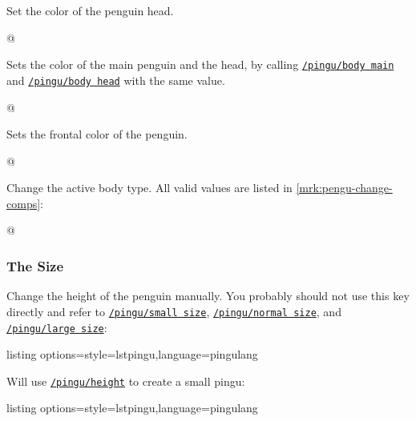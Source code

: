 \documentclass[parskip=half,english,numbers=noenddot,footnotes=nomultiple,oneside,fontsize=10pt,DIV=15,headinclude]{scrartcl}
\makeatletter
\def\pingu@listing@text{}
\def\lpingu#1{\begingroup\def\pingu@listing@text{#1}\lstinline[style=lstpingu,breakatwhitespace]'#1'\endgroup}
\newcommand*\keyref[2][/pingu/]{\hyperref[pk:#1#2]{\lpingu{#1#2}}}
\makeatother
\begin{document}
	Set the color of the penguin head.%
\begin{tcblisting}{@}
\begin{tikzpicture}
	\pingu[body head=green]
\end{tikzpicture}
\end{tcblisting}
\endkeyexplain


	Sets the color of the main penguin and the head, by calling \keyref{body main} and \keyref{body head} with the same value.
\begin{tcblisting}{@}
\begin{tikzpicture}
	\pingu[body=green]
\end{tikzpicture}
\end{tcblisting}
\endkeyexplain


	Sets the frontal color of the penguin.
\begin{tcblisting}{@}
\begin{tikzpicture}
	\pingu[body front=green]
\end{tikzpicture}
\end{tcblisting}
\endkeyexplain


	Change the active body type. All valid values are listed in \autoref{mrk:pengu-change-comps}:
\begin{tcblisting}{@}
\begin{tikzpicture}
	\pingu[body type=legacy]
\end{tikzpicture}
\end{tcblisting}
\endkeyexplain

\subsubsection{The Size}


	Change the height of the penguin manually. You probably should not use this key directly and refer to \keyref{small size}, \keyref{normal size}, and \keyref{large size}:
\begin{tcblisting}{listing options={style=lstpingu,language=pingulang}}
\begin{tikzpicture}
	\pingu[height=17mm]
\end{tikzpicture}
\end{tcblisting}
\endkeyexplain


	Will use \keyref{height} to create a small pingu:
\begin{tcblisting}{listing options={style=lstpingu,language=pingulang}}
\end{tcblisting}
\endkeyexplain
\end{document}
